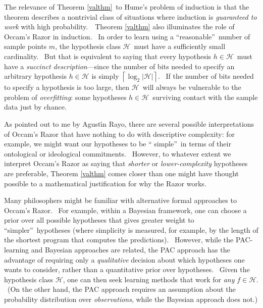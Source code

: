 \documentclass[12pt,onecolumn]{article}%
\begin{document}
The relevance of Theorem \ref{valthm}\ to Hume's problem of induction is that
the theorem describes a nontrivial class of situations where induction is
\textit{guaranteed to work} with high probability.\ \ Theorem \ref{valthm}
also illuminates the role of Occam's Razor in induction. \ In order to learn
using a \textquotedblleft reasonable\textquotedblright\ number of sample
points $m$, the hypothesis class $\mathcal{H}$\ must have a sufficiently small
cardinality. \ But that is equivalent to saying that every hypothesis
$h\in\mathcal{H}$\ must have a \textit{succinct description}---since the
number of bits needed to specify an arbitrary hypothesis $h\in\mathcal{H}$ is
simply $\left\lceil \log_{2}\left\vert \mathcal{H}\right\vert \right\rceil $.
\ If the number of bits needed to specify a hypothesis is too large, then
$\mathcal{H}$\ will always be vulnerable to the problem of
\textit{overfitting}: some hypotheses $h\in\mathcal{H}$\ surviving contact
with the sample data just by chance.

As pointed out to me by Agust\'{\i}n Rayo, there are several possible
interpretations of Occam's Razor that have nothing to do with descriptive
complexity: for example, we might want our hypotheses to be \textquotedblleft
simple\textquotedblright\ in terms of their ontological or ideological
commitments. \ However, to whatever extent we interpret Occam's Razor as
saying that \textit{shorter} or \textit{lower-complexity} hypotheses are
preferable, Theorem \ref{valthm} comes closer than one might have thought
possible to a mathematical justification for why the Razor works.

Many philosophers might be familiar with alternative formal approaches to
Occam's Razor. \ For example, within a Bayesian framework, one can choose a
prior over all possible hypotheses that gives greater weight to
\textquotedblleft simpler\textquotedblright\ hypotheses (where simplicity is
measured, for example, by the length of the shortest program that computes the
predictions). \ However, while the PAC-learning and Bayesian approaches are
related, the PAC approach has the advantage of requiring only a
\textit{qualitative} decision about which hypotheses one wants to consider,
rather than a quantitative prior over hypotheses. \ Given the hypothesis class
$\mathcal{H}$, one can then seek learning methods that work for \textit{any}
$f\in\mathcal{H}$. \ (On the other hand, the PAC approach requires an
assumption about the probability distribution over \textit{observations},
while the Bayesian approach does not.)
\end{document}
